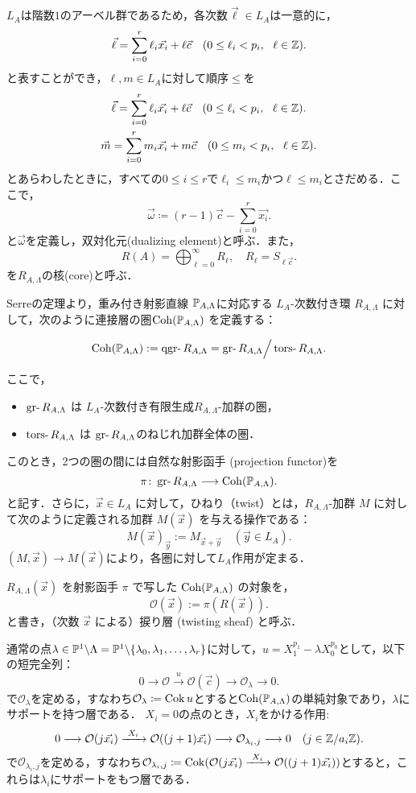 $L_A$は階数$1$のアーベル群であるため，各次数$\vec{\ell}\in L_A$は一意的に，
\[\vec{\ell} = \sum_{i=0}^r \ell_i\vec{x_i} + \ell\vec{c}\quad (0\le \ell_i < p_i,\ \ \ell \in {\mathbb Z}).\]
と表すことができ，$\ell,m\in L_A$に対して順序$\le$を
\begin{gather*}
\vec{\ell} = \sum_{i=0}^r \ell_i\vec{x_i} + \ell\vec{c}\quad (0\le \ell_i < p_i,\ \ \ell \in \ZZ).\\
\vec{m} = \sum_{i=0}^r m_i\vec{x_i} + m\vec{c}\quad (0\le m_i < p_i,\ \ \ell \in \ZZ).
\end{gather*}
とあらわしたときに，すべての$0\le i\le r$で$\ell_i\le m_i$かつ$\ell\le m_i$とさだめる．ここで，
\[\vec{\omega} \coloneq (r-1)\vec{c} - \sum_{i=0}^r\vec{x_i}.\]
と$\vec{\omega}$を定義し，双対化元(dualizing element)と呼ぶ．また，
\[R(A)= \bigoplus_{\ell=0}^\infty R_{\ell},\quad R_\ell = S_{\ell\vec{c}}.\]
を$R_{A,\Lambda}$の核(core)と呼ぶ．

\begin{defn}\cite{GL87}
	Serreの定理より，重み付き射影直線 ${\mathbb P}_{A,\Lambda}$に対応する $L_A$-次数付き環 $R_{A,\Lambda}$ に対して，次のように連接層の圏$\operatorname{\mathrm{Coh}}({\mathbb P}_{A,\Lambda})$ を定義する：

\[
	\Coh(\PP_{A,\Lambda}) := \qgr R_{A,\Lambda} = \gr R_{A,\Lambda}\Big{/}\tors R_{A,\Lambda}.
\]

ここで，
\begin{itemize}
	\item $\gr R_{A,\Lambda}$ は $L_A$-次数付き有限生成$R_{A,\Lambda}$-加群の圏，
	\item $\tors R_{A,\Lambda}$ は $\gr R_{A,\Lambda}$のねじれ加群全体の圏．
\end{itemize}
このとき，2つの圏の間には自然な射影函手 (projection functor)を
\[ \pi\colon \gr R_{A,\Lambda} \longrightarrow \Coh(\PP_{A,\Lambda}) .\]
と記す．さらに，$\vec{x} \in L_A$ に対して，ひねり（twist）とは，$R_{A,\Lambda}$-加群 $M$ に対して次のように定義される加群 $M(\vec{x})$ を与える操作である：
\[
M(\vec{x})_{\vec{y}} := M_{\vec{x} + \vec{y}} \quad (\vec{y} \in L_A).
\]
$(M,\vec{x})\to M(\vec{x})$により，各圏に対して$L_A$作用が定まる．
\end{defn}
$R_{A,\Lambda}(\vec{x})$ を射影函手 $\pi$ で写した $\operatorname{\mathrm{Coh}}({\mathbb P}_{A,\Lambda})$ の対象を，
\[ \mathcal{O}(\vec{x}) := \pi(R(\vec{x})). \]
と書き，（次数 $\vec{x}$ による）捩り層 (twisting sheaf) と呼ぶ．

通常の点$\lambda\in{\mathbb P}^1\backslash\Lambda = {\mathbb P}^1\backslash\{\lambda_0,\lambda_1,\ldots, \lambda_r\}$に対して，$u = X_1^{p_1} - \lambda X_0^{p_0}$として，以下の短完全列：
\[0\longrightarrow \mathcal{O}\xrightarrow{\ u\ }\mathcal{O}(\vec{c})\longrightarrow \mathcal{O}_{\lambda}\longrightarrow 0.\]
で$\mathcal{O}_{\lambda}$を定める，すなわち$\mathcal{O}_{\lambda}\coloneq \operatorname{Cok} u $とすると$\operatorname{\mathrm{Coh}}({\mathbb P}_{A,\Lambda})$の単純対象であり，$\lambda$にサポートを持つ層である．
$X_i=0$の点のとき，$X_i$をかける作用:
\[0\longrightarrow \mathcal{O}(j\vec{x_i})\xrightarrow{\ X_i\ }\mathcal{O}((j+1)\vec{x_i})\longrightarrow \mathcal{O}_{\lambda_i,j}\longrightarrow 0\quad (j\in \ZZ/a_i\ZZ).\]
で$\mathcal{O}_{\lambda_i,j}$を定める，すなわち$\mathcal{O}_{\lambda_i,j}\coloneq \Cok (\mathcal{O}(j\vec{x_i})\xrightarrow{\ X_i\ }\mathcal{O}((j+1)\vec{x_i}))$とすると，これらは$\lambda_i$にサポートをもつ層である．

